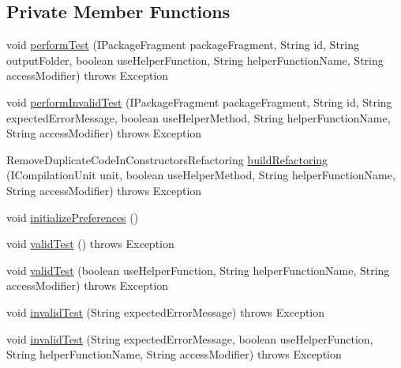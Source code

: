 \subsection*{Private Member Functions}
\begin{DoxyCompactItemize}
\item 
void \hyperlink{classedu_1_1illinois_1_1canistelCassabanana_1_1tests_1_1RemoveDuplicateCodeInConstructorsRefactoringTests_a2d4de647c15cb83590c36d37a1bc2897}{performTest} (IPackageFragment packageFragment, String id, String outputFolder, boolean useHelperFunction, String helperFunctionName, String accessModifier)  throws Exception 
\item 
void \hyperlink{classedu_1_1illinois_1_1canistelCassabanana_1_1tests_1_1RemoveDuplicateCodeInConstructorsRefactoringTests_adf0ced75cfcc1fad8b5205b04710fe82}{performInvalidTest} (IPackageFragment packageFragment, String id, String expectedErrorMessage, boolean useHelperMethod, String helperFunctionName, String accessModifier)  throws Exception 
\item 
RemoveDuplicateCodeInConstructorsRefactoring \hyperlink{classedu_1_1illinois_1_1canistelCassabanana_1_1tests_1_1RemoveDuplicateCodeInConstructorsRefactoringTests_a329bccc91cbea182e965a3e31f41c006}{buildRefactoring} (ICompilationUnit unit, boolean useHelperMethod, String helperFunctionName, String accessModifier)  throws Exception 
\item 
void \hyperlink{classedu_1_1illinois_1_1canistelCassabanana_1_1tests_1_1RemoveDuplicateCodeInConstructorsRefactoringTests_ad7c4d4d5ffaf23549e247919159f8676}{initializePreferences} ()
\item 
void \hyperlink{classedu_1_1illinois_1_1canistelCassabanana_1_1tests_1_1RemoveDuplicateCodeInConstructorsRefactoringTests_a2309845d5cf9b0ef028704323d056ae5}{validTest} ()  throws Exception 
\item 
void \hyperlink{classedu_1_1illinois_1_1canistelCassabanana_1_1tests_1_1RemoveDuplicateCodeInConstructorsRefactoringTests_a20107294a9f35b1a33995cd32d35c3e5}{validTest} (boolean useHelperFunction, String helperFunctionName, String accessModifier)  throws Exception 
\item 
void \hyperlink{classedu_1_1illinois_1_1canistelCassabanana_1_1tests_1_1RemoveDuplicateCodeInConstructorsRefactoringTests_a5b311a450f46a21f483cea1103006571}{invalidTest} (String expectedErrorMessage)  throws Exception 
\item 
void \hyperlink{classedu_1_1illinois_1_1canistelCassabanana_1_1tests_1_1RemoveDuplicateCodeInConstructorsRefactoringTests_a98c5b5a9f0495e646553f3a16263bf98}{invalidTest} (String expectedErrorMessage, boolean useHelperFunction, String helperFunctionName, String accessModifier)  throws Exception 
\end{DoxyCompactItemize}
